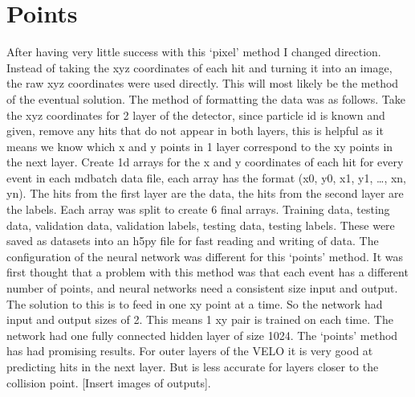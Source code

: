
\section{Points} %
After having very little success with this ‘pixel’ method I changed direction. Instead of taking the xyz coordinates of each hit and turning it into an image, the raw xyz coordinates were used directly. This will most likely be the method of the eventual solution. The method of formatting the data was as follows. Take the xyz coordinates for 2 layer of the detector, since particle id is known and given, remove any hits that do not appear in both layers, this is helpful as it means we know which x and y points in 1 layer correspond to the xy points in the next layer. Create 1d arrays for the x and y coordinates of each hit for every event in each mdbatch data file, each array has the format (x0, y0, x1, y1, …, xn, yn). The hits from the first layer are the data, the hits from the second layer are the labels. Each array was split to create 6 final arrays. Training data, testing data, validation data, validation labels, testing data, testing labels. These were saved as datasets into an h5py file for fast reading and writing of data.
The configuration of the neural network was different for this ‘points’ method. It was first thought that a problem with this method was that each event has a different number of points, and neural networks need a consistent size input and output. The solution to this is to feed in one xy point at a time. So the network had input and output sizes of 2. This means 1 xy pair is trained on each time. The network had one fully connected hidden layer of size 1024.
The ‘points’ method has had promising results. For outer layers of the VELO it is very good at predicting hits in the next layer. But is less accurate for layers closer to the collision point. [Insert images of outputs].

